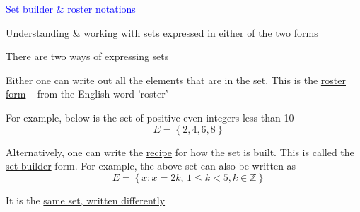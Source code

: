 \documentclass[14pt,fleqn]{extarticle}
\begin{document}
 
\begin{skill}
\textcolor{blue}{Set builder \& roster notations}

Understanding \& working with sets expressed in either of the two forms
\end{skill}

\newcard 

There are two ways of expressing sets \newline 

Either one can write out all the elements that are in the set. This is the \underline{roster form} -- from the English word 'roster'\newline 

For example, below is the set of positive even integers less than 10
\[ \quad E = \left\lbrace 2,4,6,8 \right\rbrace\]

Alternatively, one can write the \underline{recipe} for how the set is built. This is called the \underline{set-builder} form. For example, the above set can also be written as 
\[ \quad E = \left\lbrace x : x = 2k,\, 1\leq k < 5, k\in\mathbb{Z} \right\rbrace\]

It is the \underline{same set, written differently}
\end{document}
